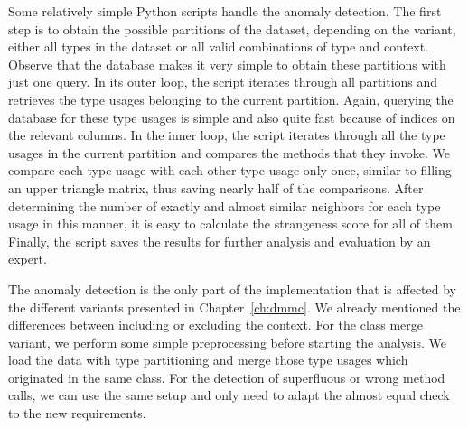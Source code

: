 Some relatively simple Python scripts handle the anomaly detection.
The first step is to obtain the possible partitions of the dataset, depending on the variant, either all types in the dataset or all valid combinations of type and context.
Observe that the database makes it very simple to obtain these partitions with just one query.
In its outer loop, the script iterates through all partitions and retrieves the type usages belonging to the current partition.
Again, querying the database for these type usages is simple and also quite fast because of indices on the relevant columns.
In the inner loop, the script iterates through all the type usages in the current partition and compares the methods that they invoke.
We compare each type usage with each other type usage only once, similar to filling an upper triangle matrix, thus saving nearly half of the comparisons.
After determining the number of exactly and almost similar neighbors for each type usage in this manner, it is easy to calculate the strangeness score for all of them.
Finally, the script saves the results for further analysis and evaluation by an expert.

The anomaly detection is the only part of the implementation that is affected by the different variants presented in Chapter~\ref{ch:dmmc}.
We already mentioned the differences between including or excluding the context.
For the class merge variant, we perform some simple preprocessing before starting the analysis.
We load the data with type partitioning and merge those type usages which originated in the same class.
For the detection of superfluous or wrong method calls, we can use the same setup and only need to adapt the almost equal check to the new requirements.

